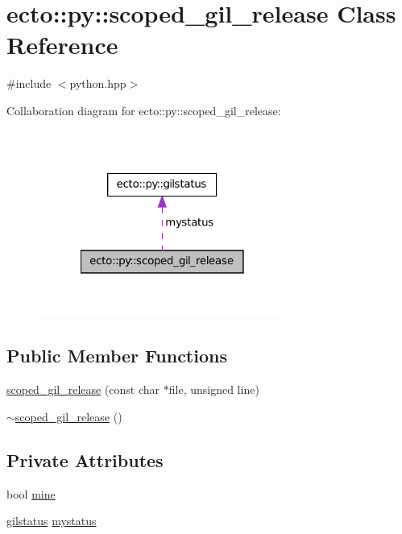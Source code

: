 \hypertarget{classecto_1_1py_1_1scoped__gil__release}{\section{ecto\-:\-:py\-:\-:scoped\-\_\-gil\-\_\-release \-Class \-Reference}
\label{classecto_1_1py_1_1scoped__gil__release}
}


{\ttfamily \#include $<$python.\-hpp$>$}



\-Collaboration diagram for ecto\-:\-:py\-:\-:scoped\-\_\-gil\-\_\-release\-:\nopagebreak
\begin{figure}[H]
\begin{center}
\leavevmode
\includegraphics[width=230pt]{classecto_1_1py_1_1scoped__gil__release__coll__graph}
\end{center}
\end{figure}
\subsection*{\-Public \-Member \-Functions}
\begin{DoxyCompactItemize}
\item 
\hyperlink{classecto_1_1py_1_1scoped__gil__release_afd4cb62267206421eca93969a8bb0865}{scoped\-\_\-gil\-\_\-release} (const char $\ast$file, unsigned line)
\item 
\hyperlink{classecto_1_1py_1_1scoped__gil__release_addd644daf557129d6584829cda6b9cc0}{$\sim$scoped\-\_\-gil\-\_\-release} ()
\end{DoxyCompactItemize}
\subsection*{\-Private \-Attributes}
\begin{DoxyCompactItemize}
\item 
bool \hyperlink{classecto_1_1py_1_1scoped__gil__release_a9e9fbf0c5819ac1b706437d99a6459a3}{mine}
\item 
\hyperlink{structecto_1_1py_1_1gilstatus}{gilstatus} \hyperlink{classecto_1_1py_1_1scoped__gil__release_a888a6813c86b9bbd2d5cd0d4a0f7e2f2}{mystatus}
\end{DoxyCompactItemize}
